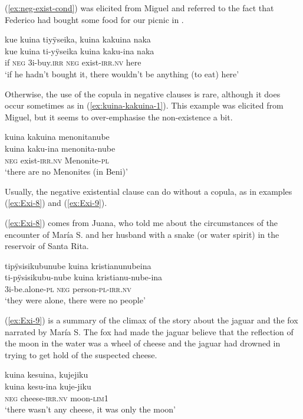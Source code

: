(\ref{ex:neg-exist-cond}) was elicited from Miguel and referred to the fact that Federico had bought some food for our picnic in .

\ea\label{ex:neg-exist-cond}
\begingl 
\glpreamble kue kuina tiyÿseika, kuina kakuina naka\\
\gla kue kuina ti-yÿseika kuina kaku-ina naka\\ 
\glb if \textsc{neg} 3i-buy.\textsc{irr} \textsc{neg} exist-\textsc{irr.nv} here\\ 
\glft ‘if he hadn’t bought it, there wouldn’t be anything (to eat) here’
\xe

Otherwise, the use of the copula in negative clauses is rare, although it does occur sometimes as in (\ref{ex:kuina-kakuina-1}). This example was elicited from Miguel, but it seems to over-emphasise the non-existence a bit.

\ea\label{ex:kuina-kakuina-1}
\begingl 
\glpreamble kuina kakuina menonitanube\\
\gla kuina kaku-ina menonita-nube\\ 
\glb \textsc{neg} exist-\textsc{irr.nv} Menonite-\textsc{pl}\\ 
\glft ‘there are no Menonites (in Beni)’
\trailingcitation{[jmx-e090727s.357]}
\xe

Usually, the negative existential clause can do without a copula, as in examples (\ref{ex:Exi-8}) and (\ref{ex:Exi-9}).

(\ref{ex:Exi-8}) comes from Juana, who told me about the circumstances of the encounter of María S. and her husband with a snake (or water spirit) in the reservoir of Santa Rita.

\ea\label{ex:Exi-8}
\begingl
\glpreamble tipÿsisikubunube kuina kristianunubeina\\
\gla ti-pÿsisikubu-nube kuina kristianu-nube-ina\\
\glb 3i-be.alone-\textsc{pl} \textsc{neg} person-\textsc{pl}-\textsc{irr.nv}\\
\glft ‘they were alone, there were no people’
\endgl
\trailingcitation{[jxx-p120515l-2.145]}
\xe

\largerpage[-1]
(\ref{ex:Exi-9}) is a summary of the climax of the story about the jaguar and the fox narrated by María S. The fox had made the jaguar believe that the reflection of the moon in the water was a wheel of cheese and the jaguar had drowned in trying to get hold of the suspected cheese.

\ea\label{ex:Exi-9}
\begingl
\glpreamble kuina kesuina, kujejiku\\
\gla kuina kesu-ina kuje-jiku\\
\glb \textsc{neg} cheese-\textsc{irr.nv} moon-\textsc{lim}1\\
\glft ‘there wasn’t any cheese, it was only the moon’
\endgl
\trailingcitation{[rxx-n120511l-1.044]}
\xe
{}


